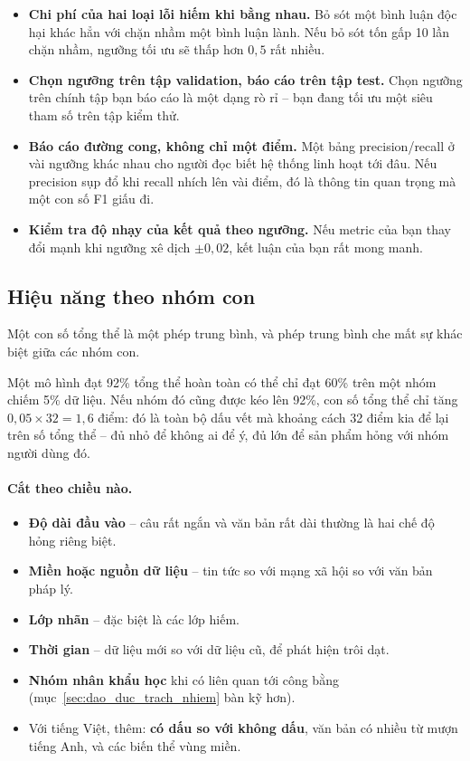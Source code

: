 \begin{itemize}
	\item \textbf{Chi phí của hai loại lỗi hiếm khi bằng nhau.} Bỏ sót một bình luận độc hại khác hẳn với chặn nhầm một bình luận lành. Nếu bỏ sót tốn gấp 10 lần chặn nhầm, ngưỡng tối ưu sẽ thấp hơn $0{,}5$ rất nhiều.
	\item \textbf{Chọn ngưỡng trên tập validation, báo cáo trên tập test.} Chọn ngưỡng trên chính tập bạn báo cáo là một dạng rò rỉ -- bạn đang tối ưu một siêu tham số trên tập kiểm thử.
	\item \textbf{Báo cáo đường cong, không chỉ một điểm.} Một bảng precision/recall ở vài ngưỡng khác nhau cho người đọc biết hệ thống linh hoạt tới đâu. Nếu precision sụp đổ khi recall nhích lên vài điểm, đó là thông tin quan trọng mà một con số F1 giấu đi.
	\item \textbf{Kiểm tra độ nhạy của kết quả theo ngưỡng.} Nếu metric của bạn thay đổi mạnh khi ngưỡng xê dịch $\pm 0{,}02$, kết luận của bạn rất mong manh.
\end{itemize}

\subsection{Hiệu năng theo nhóm con}
\label{ssec:subgroup_performance}

Một con số tổng thể là một phép trung bình, và phép trung bình che mất sự khác biệt giữa các nhóm con.

Một mô hình đạt 92\% tổng thể hoàn toàn có thể chỉ đạt 60\% trên một nhóm chiếm 5\% dữ liệu. Nếu nhóm đó cũng được kéo lên 92\%, con số tổng thể chỉ tăng $0{,}05 \times 32 = 1{,}6$ điểm: đó là toàn bộ dấu vết mà khoảng cách 32 điểm kia để lại trên số tổng thể -- đủ nhỏ để không ai để ý, đủ lớn để sản phẩm hỏng với nhóm người dùng đó.

\paragraph{Cắt theo chiều nào.}
\begin{itemize}
	\item \textbf{Độ dài đầu vào} -- câu rất ngắn và văn bản rất dài thường là hai chế độ hỏng riêng biệt.
	\item \textbf{Miền hoặc nguồn dữ liệu} -- tin tức so với mạng xã hội so với văn bản pháp lý.
	\item \textbf{Lớp nhãn} -- đặc biệt là các lớp hiếm.
	\item \textbf{Thời gian} -- dữ liệu mới so với dữ liệu cũ, để phát hiện trôi dạt.
	\item \textbf{Nhóm nhân khẩu học} khi có liên quan tới công bằng (mục~\ref{sec:dao_duc_trach_nhiem} bàn kỹ hơn).
	\item Với tiếng Việt, thêm: \textbf{có dấu so với không dấu}, văn bản có nhiều từ mượn tiếng Anh, và các biến thể vùng miền.
\end{itemize}

